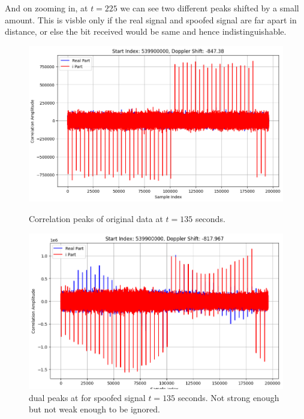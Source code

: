 \documentclass[12pt]{report}
\begin{document}
And on zooming in, at $t = 225$ we can see two different peaks shifted by a small amount. This is visble only if the real signal and spoofed signal are far apart in distance, or else the bit received would be same and hence indistinguishable.

\begin{figure}[H]
  \centering
  \begin{minipage}{0.48\textwidth}
    \centering
    \includegraphics[width=\textwidth]{t135.png}
    \caption{Correlation peaks of original data at $t = 135$ seconds.}
    \label{fig:t135}
  \end{minipage}
  \hfill
  \begin{minipage}{0.48\textwidth}
    \centering
    \includegraphics[width=\textwidth]{t135_sp.png}
    \caption{dual peaks at for spoofed signal $t = 135$ seconds. Not strong enough but not weak enough to be ignored.}
    \label{fig:t135_sp}
  \end{minipage}
\end{figure}
\end{document}
